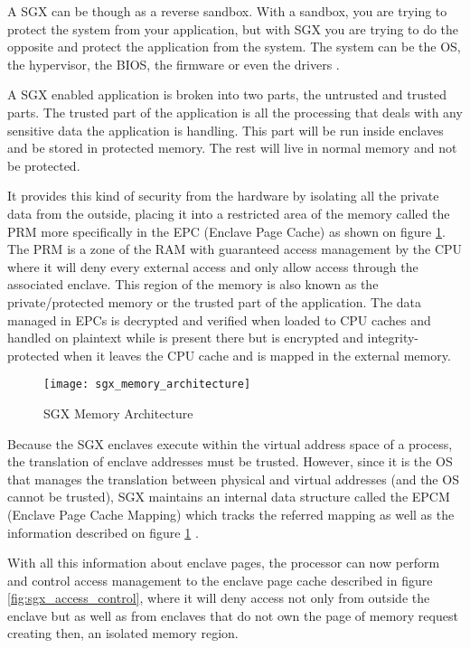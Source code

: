 A \gls{SGX} can be though as a reverse sandbox. With a sandbox, you are trying to protect the system from your application, but with \gls{SGX} you are trying to do the opposite and protect the application from the system. The system can be the \gls{OS}, the hypervisor, the BIOS, the firmware or even the drivers \cite{sgx:2}.

A \gls{SGX} enabled application is broken into two parts, the untrusted and trusted parts. The trusted part of the application is all the processing that deals with any sensitive data the application is handling. This part will be run inside enclaves and be stored in protected memory. The rest will live in normal memory and not be protected.

It provides this kind of security from the hardware by isolating all the private data from the outside, placing it into a restricted area of the memory called the \gls{PRM} more specifically in the \gls{EPC} (Enclave Page Cache) as shown on figure \ref{fig:sgx_memory_architecture}. The \gls{PRM} is a zone of the \gls{RAM} with guaranteed access management by the CPU where it will deny every external access and only allow access through the associated enclave. This region of the memory is also known as the private/protected memory or the trusted part of the application. The data managed in \glspl{EPC} is decrypted and verified when loaded to CPU caches and handled on plaintext while is present there but is encrypted and integrity-protected when it leaves the CPU cache and is mapped in the external memory.

\begin{figure}[htbp]
	\centering
	{\texttt{[image: sgx\_memory\_architecture]}}%
	\caption{\gls{SGX} Memory Architecture \cite{sgx:4}}
	\label{fig:sgx_memory_architecture}
\end{figure}

Because the \gls{SGX} enclaves execute within the virtual address space of a process, the translation of enclave addresses must be trusted. However, since it is the \gls{OS} that manages the translation between physical and virtual addresses (and the \gls{OS} cannot be trusted), \gls{SGX} maintains an internal data structure called the \gls{EPCM} (Enclave Page Cache Mapping) which tracks the referred mapping as well as the information described on figure \ref{fig:sgx_memory_architecture} \cite{sgx:5}.

With all this information about enclave pages, the processor can now perform and control access management to the enclave page cache described in figure \ref{fig:sgx_access_control}, where it will deny access not only from outside the enclave but as well as from enclaves that do not own the page of memory request creating then, an isolated memory region.

